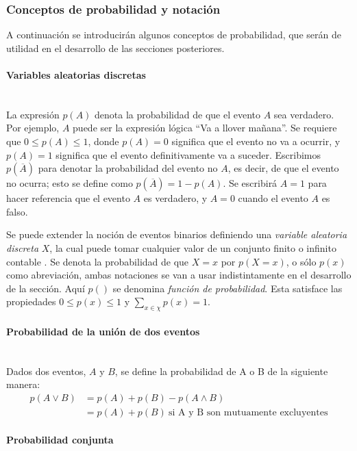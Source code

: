 \subsubsection{Conceptos de probabilidad y notación}

	A continuación se introducirán algunos conceptos de probabilidad, que serán de utilidad en el desarrollo de las secciones posteriores.

	\paragraph*{Variables aleatorias discretas} ~\\

		La expresión $p(A)$ denota la probabilidad de que el evento $A$ sea verdadero. Por ejemplo, $A$ puede ser la expresión lógica ``Va a llover mañana''. Se requiere que $0 \leq p(A) \leq 1$, donde $p(A)=0$ significa que el evento no va a ocurrir, y $p(A)=1$ significa que el evento definitivamente va a suceder. Escribimos $p(\overline{A})$ para denotar la probabilidad del evento no $A$, es decir, de que el evento no ocurra; esto se define como $p(\overline{A})=1-p(A)$. Se escribirá $A=1$ para hacer referencia que el evento $A$ es verdadero, y $A=0$ cuando el evento $A$ es falso.
		
		Se puede extender la noción de eventos binarios definiendo una \textit{variable aleatoria discreta} $X$, la cual puede tomar cualquier valor de un conjunto finito o infinito contable \scalebox{1.4}{$\chi$}. Se denota la probabilidad de que $X=x$ por $p(X=x)$, o sólo $p(x)$ como abreviación, ambas notaciones se van a usar indistintamente en el desarrollo de la sección. Aquí $p()$ se denomina \textit{función de probabilidad}. Esta satisface las propiedades $0 \leq p(x) \leq 1$ y $\sum_{x \in \chi}p(x)=1$.
		
	\paragraph*{Probabilidad de la unión de dos eventos} ~\\
		
		Dados dos eventos, $A$ y $B$, se define la probabilidad de A o B de la siguiente manera:
		\begin{align}
			p(A \lor B) &= p(A) + p(B) - p(A \land B) \\
			&= p(A) + p(B) ~\text{si A y B son mutuamente excluyentes}
		\end{align}
		
	\paragraph*{Probabilidad conjunta} ~\\
	
